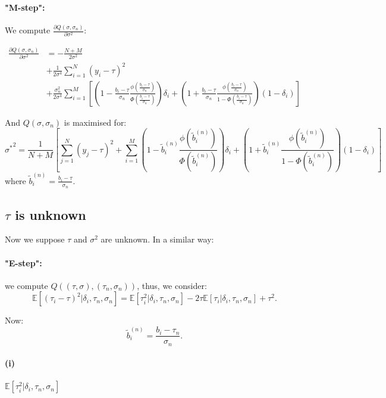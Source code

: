 \documentclass[11pt]{article}
\begin{document}
\paragraph*{"M-step":}
We compute $\frac{\partial Q(\sigma, \sigma_n)}{\partial \sigma^2}$:

\begin{align*}
  \frac{\partial Q(\sigma, \sigma_n)}{\partial \sigma^2} &= - \frac{N + M}{2 \sigma^2} \\
  &+ \frac{1}{2\sigma^4} \sum_{i = 1}^N (y_i - \tau)^2 \\
  &+ \frac{\sigma_n^2}{2\sigma^4} \sum_{i = 1}^M \left[ \left(1 - \frac{b_i - \tau}{\sigma_n} \frac{\phi\left(\frac{b_i - \tau}{\sigma_n}\right)}{ \Phi\left(\frac{b_i - \tau}{\sigma_n}\right)}\right)\delta_i +  \left(1 + \frac{b_i - \tau}{\sigma_n} \frac{\phi\left(\frac{b_i - \tau}{\sigma_n}\right)}{ 1 - \Phi\left(\frac{b_i - \tau}{\sigma_n}\right)}\right)(1-\delta_i)\right]
\end{align*}

And $Q(\sigma, \sigma_n)$ is maximised for:
\[
  {\sigma^*}^2 = \frac{1}{N + M} \left[ \sum_{j = 1}^N (y_j - \tau)^2 + \sum_{i = 1}^M \left(1 - \tilde{b}_i^{(n)} \frac{\phi\left(\tilde{b}_i^{(n)}\right)}{ \Phi\left(\tilde{b}_i^{(n)}\right)}\right)\delta_i +  \left(1 + \tilde{b}_i^{(n)} \frac{\phi\left(\tilde{b}_i^{(n)}\right)}{ 1 - \Phi\left(\tilde{b}_i^{(n)}\right)}\right)(1-\delta_i)\right]
\]
where $\tilde{b}_i^{(n)} = \frac{b_i - \tau}{\sigma_n}$.

\subsection*{$\tau$ is unknown}

Now we suppose $\tau$ and $\sigma^2$ are unknown. In a similar way:
\paragraph*{"E-step":} we compute $Q((\tau, \sigma), (\tau_n, \sigma_n))$, thus, we consider:
\[
  \mathbb{E}\left[(\tau_i - \tau)^2| \delta_i, \tau_n, \sigma_n \right] = \mathbb{E}\left[\tau_i^2 | \delta_i, \tau_n, \sigma_n \right] - 2 \tau \mathbb{E}\left[\tau_i| \delta_i, \tau_n, \sigma_n \right] + \tau^2.
\]

Now:
\[ 
\tilde{b}_i^{(n)} =  \frac{b_i - \tau_n}{\sigma_n}.
\]
\paragraph*{(i)} $\mathbb{E}\left[\tau_i^2 | \delta_i, \tau_n, \sigma_n \right]$
\end{document}
